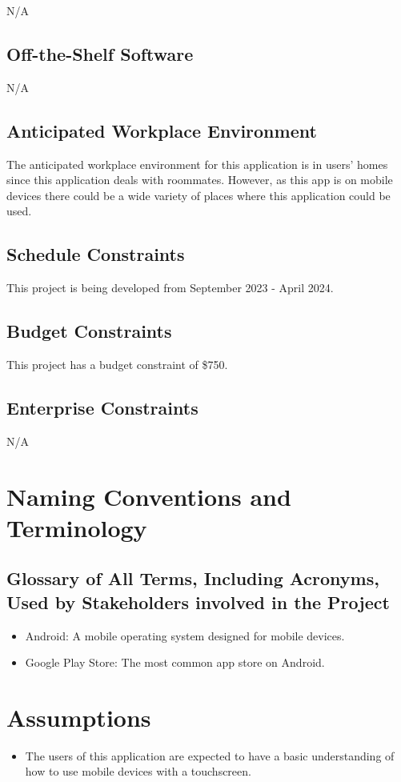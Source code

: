 \documentclass[12pt]{article}
\newcommand{\lips}{\textit{Insert your content here.}}
\begin{document}
N/A

\subsection{Off-the-Shelf Software}

N/A

\subsection{Anticipated Workplace Environment}
The anticipated workplace environment for this application is in users' homes since this application deals with roommates. However, as this app is on mobile devices there could be a wide variety of places where this application could be used.

\subsection{Schedule Constraints}
This project is being developed from September 2023 - April 2024.
\subsection{Budget Constraints}
This project has a budget constraint of \$750.
\subsection{Enterprise Constraints}
N/A

\section{Naming Conventions and Terminology}
\subsection{Glossary of All Terms, Including Acronyms, Used by Stakeholders
involved in the Project}
\begin{itemize}
    \item Android: A mobile operating system designed for mobile devices.
    \item Google Play Store: The most common app store on Android. 
\end{itemize}

\section{Assumptions}
\begin{itemize}
    \item The users of this application are expected to have a basic understanding of how to use mobile devices with a touchscreen.
\end{itemize}
\end{document}
